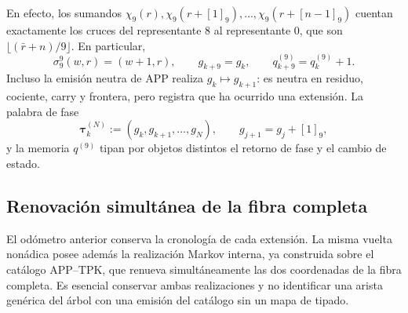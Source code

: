 En efecto, los sumandos
\(\chi_9(r),\chi_9(r+[1]_9),\ldots,\chi_9(r+[n-1]_9)\)
cuentan exactamente los cruces del representante \(8\) al representante
\(0\), que son
\(\lfloor(\bar r+n)/9\rfloor\). En particular,
\begin{equation}
\label{eq:continuo-comun-retorno-fase-avance-memoria}
 \sigma_9^9(w,r)=(w+1,r),\qquad
 g_{k+9}=g_k,\qquad q^{(9)}_{k+9}=q^{(9)}_k+1.
\end{equation}
Incluso la emisión neutra de APP realiza
\(g_k\mapsto g_{k+1}\): es neutra en residuo, cociente, carry y frontera,
pero registra que ha ocurrido una extensión. La palabra de fase
\begin{equation}
\label{eq:continuo-comun-palabra-fase-tpk}
 \boldsymbol\tau_k^{(N)}:=(g_k,g_{k+1},\ldots,g_N),
 \qquad g_{j+1}=g_j+[1]_9,
\end{equation}
y la memoria \(q^{(9)}\) tipan por objetos distintos el retorno de fase y
el cambio de estado.

\subsection{Renovación simultánea de la fibra completa}
\label{sec:continuo-comun-kph}

El odómetro anterior conserva la cronología de cada extensión. La misma
vuelta nonádica posee además la realización Markov interna, ya construida
sobre el catálogo APP--TPK, que renueva simultáneamente las dos coordenadas
de la fibra completa. Es esencial conservar ambas realizaciones y no
identificar una arista genérica del árbol con una emisión del catálogo sin
un mapa de tipado.

